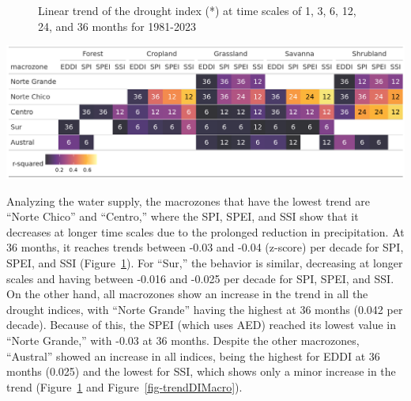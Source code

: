 \documentclass[
  authoryear,
  preprint,
  3p,
  onecolumn]{elsarticle}
\begin{document}
\begin{figure}
\begin{minipage}[t]{0.50\linewidth}
{{}

}

\end{minipage}%

\caption{\label{fig-trendDI}Linear trend of the drought index (*) at
time scales of 1, 3, 6, 12, 24, and 36 months for 1981-2023}

\end{figure}

\elandscape

\begin{table}[!ht]
\caption{Summarry per land cover macroclass and macrozone regarding the correlation between zcNDVI with the drought indices EDDI, SPI, SPEI, and SSI for time scales of 1, 3, 6, 12, 24, and 36. The numbers in each cell indicate the time scale that reached the maximum correlation for the land cover and macrozone, and the color indicates the strength of the r-squared obtained with the index and the time scale.}
\label{tab-corlandcover}
\includegraphics[]{../output/figs/tabla_r_cor_macro_indice.png}
\end{table}

Analyzing the water supply, the macrozones that have the lowest trend
are ``Norte Chico'' and ``Centro,'' where the SPI, SPEI, and SSI show
that it decreases at longer time scales due to the prolonged reduction
in precipitation. At 36 months, it reaches trends between -0.03 and
-0.04 (z-score) per decade for SPI, SPEI, and SSI
(Figure~\ref{fig-trendDI}). For ``Sur,'' the behavior is similar,
decreasing at longer scales and having between -0.016 and -0.025 per
decade for SPI, SPEI, and SSI. On the other hand, all macrozones show an
increase in the trend in all the drought indices, with ``Norte Grande''
having the highest at 36 months (0.042 per decade). Because of this, the
SPEI (which uses AED) reached its lowest value in ``Norte Grande,'' with
-0.03 at 36 months. Despite the other macrozones, ``Austral'' showed an
increase in all indices, being the highest for EDDI at 36 months (0.025)
and the lowest for SSI, which shows only a minor increase in the trend
(Figure~\ref{fig-trendDI} and Figure~\ref{fig-trendDIMacro}).
\end{document}
